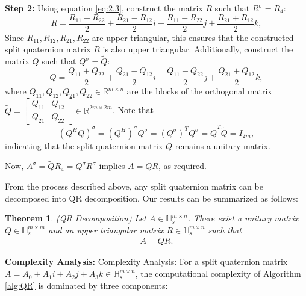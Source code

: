 \documentclass[12pt]{article}
\newtheorem{theorem}{Theorem}[section]
\begin{document}
\textbf{Step 2:} Using equation \eqref{eq:2.3}, construct the matrix $R$ such that $R^\sigma=R_4:$
\begin{equation*}
R = \frac{R_{11} + R_{22}}{2} + \frac{R_{21} - R_{12}}{2}i + \frac{R_{11} - R_{22}}{2}j + \frac{R_{21} + R_{12}}{2}k,
\end{equation*}
Since $R_{11}, R_{12}, R_{21}, R_{22}$ are upper triangular, this ensures that the constructed split quaternion matrix $R$ is also upper triangular. Additionally, construct the matrix $Q$ such that $Q^\sigma=\widetilde{Q}:$
\begin{equation*}
Q = \frac{Q_{11} + Q_{22}}{2} + \frac{Q_{21} - Q_{12}}{2}i + \frac{Q_{11} - Q_{22}}{2}j + \frac{Q_{21} + Q_{12}}{2}k,
\end{equation*}
where $Q_{11}, Q_{12}, Q_{21}, Q_{22} \in \mathbb{R}^{m \times n}$ are the blocks of the orthogonal matrix $\widetilde{Q} = \begin{bmatrix} Q_{11} & Q_{12} \\ Q_{21} & Q_{22} \end{bmatrix} \in \mathbb{R}^{2m \times 2m}$. Note that \[(Q^H Q)^\sigma = {(Q^H)}^\sigma Q^\sigma = {(Q^\sigma)}^TQ^\sigma = \widetilde{Q}^T\widetilde{Q} = I_{2m},\] indicating that the split quaternion matrix $Q$ remains a unitary matrix.

Now, $A^\sigma=\widetilde{Q}R_4=Q^\sigma R^\sigma$ implies
$A = Q R$, as required.

From the process described above, any split quaternion matrix can be decomposed into QR decomposition. Our results can be summarized as follows:
\begin{theorem}(QR Decomposition)
    Let $A \in \mathbb{H}_s^{m \times n}$. There exist a unitary matrix $Q \in \mathbb{H}_s^{m \times m}$ and an upper triangular matrix $R \in \mathbb{H}_s^{m \times n}$ such that
    \begin{eqnarray}\label{eq:split QR}
        A = Q R.
    \end{eqnarray}
\end{theorem}

\textbf{Complexity Analysis:}
{Complexity Analysis:} For a split quaternion matrix $A = A_0 + A_1i + A_2j + A_3k \in \mathbb{H}_s^{m \times n}$, the computational complexity of Algorithm \ref{alg:QR} is dominated by three components:  
\end{document}
